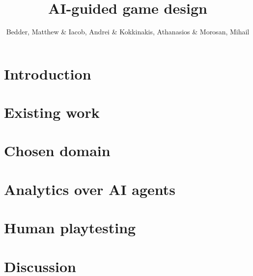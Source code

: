 \documentclass[9pt]{IEEEtran}
\title{AI-guided game design}
\author{Bedder, Matthew \& Iacob, Andrei \& Kokkinakis, Athanasios \& Morosan, Mihail}
\begin{document}
\maketitle
\section{Introduction}

\section{Existing work}

\section{Chosen domain}

\section{Analytics over AI agents}

\section{Human playtesting}

\section{Discussion}




\end{document}

